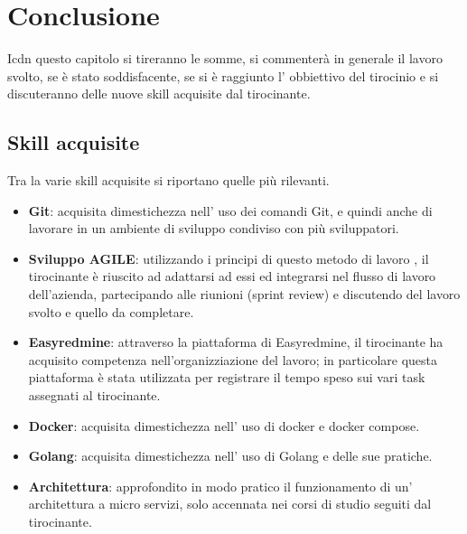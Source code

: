\documentclass[a4paper,12pt,titlepage,italian,openany]{report}
\begin{document}
\chapter{Conclusione}
Icdn questo capitolo si tireranno le somme, si commenterà in generale il lavoro svolto, se è stato soddisfacente, se si è raggiunto l' obbiettivo del tirocinio e si discuteranno delle nuove skill acquisite dal tirocinante.
\section{Skill acquisite}
Tra la varie skill acquisite si riportano quelle più rilevanti.
\begin{itemize}
    \item[] \textbf{Git}: acquisita dimestichezza nell' uso dei comandi Git, e quindi anche di lavorare in un ambiente di sviluppo condiviso con più sviluppatori.
    \item[] \textbf{Sviluppo AGILE}: utilizzando i principi di questo metodo di lavoro , il tirocinante è riuscito ad adattarsi ad essi ed integrarsi nel flusso di lavoro dell'azienda, partecipando alle riunioni (sprint review) e discutendo del lavoro svolto e quello da completare.
    \item[] \textbf{Easyredmine}: attraverso la piattaforma di Easyredmine\cite{easyredmine:1}, il tirocinante ha acquisito competenza nell'organizziazione del lavoro; in particolare questa piattaforma è stata utilizzata per registrare il tempo speso sui vari task assegnati al tirocinante.
    \item[] \textbf{Docker}: acquisita dimestichezza nell' uso di docker e docker compose.
    \item[] \textbf{Golang}: acquisita dimestichezza nell' uso di Golang e delle sue pratiche.
    \item[] \textbf{Architettura}: approfondito in modo pratico il funzionamento di un' architettura a micro servizi, solo accennata nei corsi di studio seguiti dal tirocinante.
    
\end{itemize}
\end{document}

